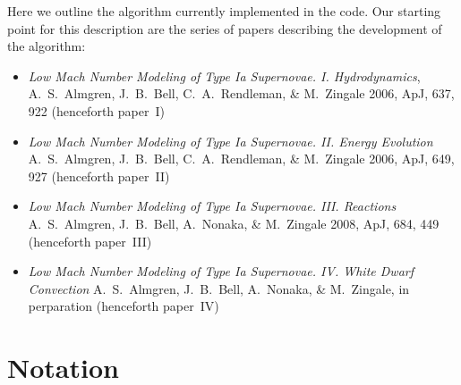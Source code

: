 
Here we outline the algorithm currently implemented in the code.  Our
starting point for this description are the series of papers describing
the development of the algorithm:
\begin{itemize}
\item {\em Low Mach Number Modeling of Type Ia
  Supernovae. I. Hydrodynamics}, A.~S.~Almgren, J.~B.~Bell, 
  C.~A.~Rendleman, \& M.~Zingale 2006, ApJ, 637, 922 (henceforth
  paper~I)
\item {\em Low Mach Number Modeling of Type Ia Supernovae. II. Energy
  Evolution} A.~S.~Almgren, J.~B.~Bell, C.~A.~Rendleman, \& M.~Zingale
  2006, ApJ, 649, 927 (henceforth paper~II)
\item {\em Low Mach Number Modeling of Type Ia Supernovae. III. Reactions}
A.~S.~Almgren, J.~B.~Bell, A.~Nonaka, \& M.~Zingale
  2008, ApJ, 684, 449 (henceforth paper~III)
\item {\em Low Mach Number Modeling of Type Ia Supernovae. IV. White Dwarf Convection}
A.~S.~Almgren, J.~B.~Bell, A.~Nonaka, \& M.~Zingale,
  in perparation (henceforth paper~IV)
\end{itemize}


\section{Notation}



